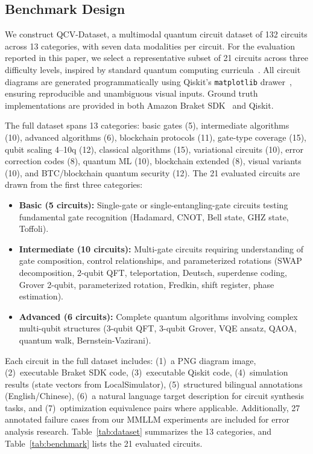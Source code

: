 \documentclass[conference]{IEEEtran}
\begin{document}
\subsection{Benchmark Design}

We construct QCV-Dataset, a multimodal quantum circuit dataset of 132 circuits across 13 categories, with seven data modalities per circuit. For the evaluation reported in this paper, we select a representative subset of 21 circuits across three difficulty levels, inspired by standard quantum computing curricula~\cite{nielsen2010quantum}. All circuit diagrams are generated programmatically using Qiskit's \texttt{matplotlib} drawer~\cite{qiskit}, ensuring reproducible and unambiguous visual inputs. Ground truth implementations are provided in both Amazon Braket SDK~\cite{braket} and Qiskit.

The full dataset spans 13 categories: basic gates (5), intermediate algorithms (10), advanced algorithms (6), blockchain protocols (11), gate-type coverage (15), qubit scaling 4--10q (12), classical algorithms (15), variational circuits (10), error correction codes (8), quantum ML (10), blockchain extended (8), visual variants (10), and BTC/blockchain quantum security (12). The 21 evaluated circuits are drawn from the first three categories:

\begin{itemize}
    \item \textbf{Basic (5 circuits):} Single-gate or single-entangling-gate circuits testing fundamental gate recognition (Hadamard, CNOT, Bell state, GHZ state, Toffoli).
    \item \textbf{Intermediate (10 circuits):} Multi-gate circuits requiring understanding of gate composition, control relationships, and parameterized rotations (SWAP decomposition, 2-qubit QFT, teleportation, Deutsch, superdense coding, Grover 2-qubit, parameterized rotation, Fredkin, shift register, phase estimation).
    \item \textbf{Advanced (6 circuits):} Complete quantum algorithms involving complex multi-qubit structures (3-qubit QFT, 3-qubit Grover, VQE ansatz, QAOA, quantum walk, Bernstein-Vazirani).
\end{itemize}

Each circuit in the full dataset includes: (1)~a PNG diagram image, (2)~executable Braket SDK code, (3)~executable Qiskit code, (4)~simulation results (state vectors from LocalSimulator), (5)~structured bilingual annotations (English/Chinese), (6)~a natural language target description for circuit synthesis tasks, and (7)~optimization equivalence pairs where applicable. Additionally, 27 annotated failure cases from our MMLLM experiments are included for error analysis research. Table~\ref{tab:dataset} summarizes the 13 categories, and Table~\ref{tab:benchmark} lists the 21 evaluated circuits.
\end{document}
